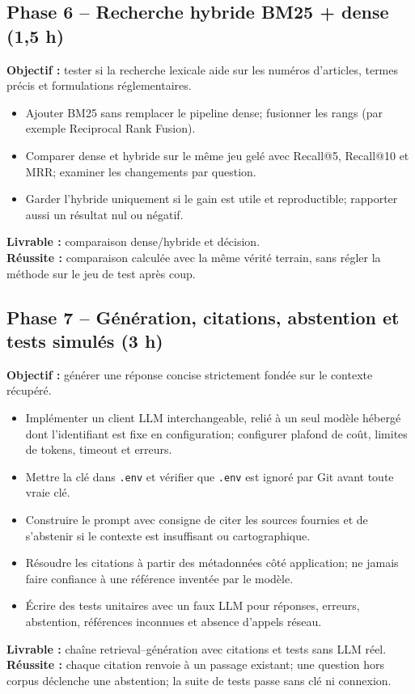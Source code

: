 \documentclass[11pt,a4paper]{article}
\begin{document}
\subsection*{Phase 6 -- Recherche hybride BM25 + dense (1,5 h)}
\textbf{Objectif :} tester si la recherche lexicale aide sur les numéros d'articles, termes précis et formulations réglementaires.
\begin{itemize}
  \item Ajouter BM25 sans remplacer le pipeline dense; fusionner les rangs (par exemple Reciprocal Rank Fusion).
  \item Comparer dense et hybride sur le même jeu gelé avec Recall@5, Recall@10 et MRR; examiner les changements par question.
  \item Garder l'hybride uniquement si le gain est utile et reproductible; rapporter aussi un résultat nul ou négatif.
\end{itemize}
\textbf{Livrable :} comparaison dense/hybride et décision.\\
\textbf{Réussite :} comparaison calculée avec la même vérité terrain, sans régler la méthode sur le jeu de test après coup.

\subsection*{Phase 7 -- Génération, citations, abstention et tests simulés (3 h)}
\textbf{Objectif :} générer une réponse concise strictement fondée sur le contexte récupéré.
\begin{itemize}
  \item Implémenter un client LLM interchangeable, relié à un seul modèle hébergé dont l'identifiant est fixe en configuration; configurer plafond de coût, limites de tokens, timeout et erreurs.
  \item Mettre la clé dans \texttt{.env} et vérifier que \texttt{.env} est ignoré par Git avant toute vraie clé.
  \item Construire le prompt avec consigne de citer les sources fournies et de s'abstenir si le contexte est insuffisant ou cartographique.
  \item Résoudre les citations à partir des métadonnées côté application; ne jamais faire confiance à une référence inventée par le modèle.
  \item Écrire des tests unitaires avec un faux LLM pour réponses, erreurs, abstention, références inconnues et absence d'appels réseau.
\end{itemize}
\textbf{Livrable :} chaîne retrieval--génération avec citations et tests sans LLM réel.\\
\textbf{Réussite :} chaque citation renvoie à un passage existant; une question hors corpus déclenche une abstention; la suite de tests passe sans clé ni connexion.
\end{document}
